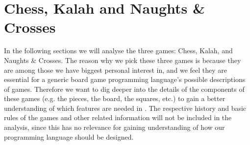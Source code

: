 \section{Chess, Kalah and Naughts \& Crosses}

In the following sections we will analyse the three games: Chess,
Kalah, and Naughts \& Crosses. The reason why we pick these three games is because they are among those we have biggest personal
interest in, and we feel they are essential for a generic board game programming language's possible descriptions of games. Therefore we want to dig
deeper into the details of the components of these games (e.g. the
pieces, the board, the squares, etc.) to gain a better understanding
of which features are needed in \productname. The respective history
and basic rules of the games and other related information will not
be included in the analysis, since this has no relevance for gaining
understanding of how our programming language should be designed.



      

